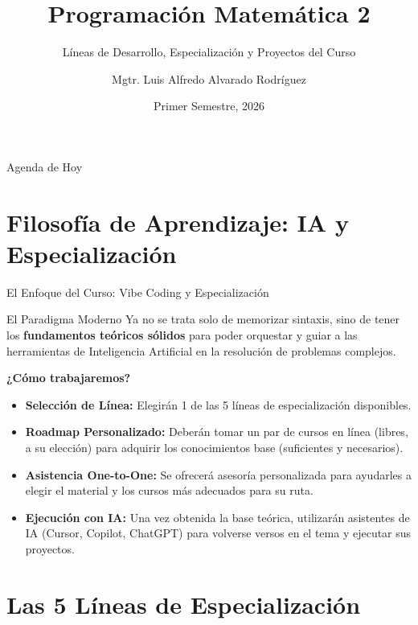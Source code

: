 \documentclass[aspectratio=169]{beamer}
\title[PM2 - Líneas y Proyectos]{Programación Matemática 2}
\subtitle{Líneas de Desarrollo, Especialización y Proyectos del Curso}
\author[Luis Alfredo Alvarado]{Mgtr. Luis Alfredo Alvarado Rodríguez}
\institute[ECFM - USAC]{
    Escuela de Ciencias Físicas y Matemáticas \\
    Universidad de San Carlos de Guatemala
}
\date{Primer Semestre, 2026}
\begin{document}
\begin{frame}
    \titlepage
\end{frame}

\begin{frame}{Agenda de Hoy}
    \tableofcontents
\end{frame}

\section{Filosofía de Aprendizaje: IA y Especialización}

\begin{frame}{El Enfoque del Curso: Vibe Coding y Especialización}
    \begin{block}{El Paradigma Moderno}
        Ya no se trata solo de memorizar sintaxis, sino de tener los \textbf{fundamentos teóricos sólidos} para poder orquestar y guiar a las herramientas de Inteligencia Artificial en la resolución de problemas complejos.
    \end{block}
    
    \vspace{0.3cm}
    \textbf{¿Cómo trabajaremos?}
    \begin{itemize}
        \item \textbf{Selección de Línea:} Elegirán 1 de las 5 líneas de especialización disponibles.
        \item \textbf{Roadmap Personalizado:} Deberán tomar un par de cursos en línea (libres, a su elección) para adquirir los conocimientos base (suficientes y necesarios).
        \item \textbf{Asistencia One-to-One:} Se ofrecerá asesoría personalizada para ayudarles a elegir el material y los cursos más adecuados para su ruta.
        \item \textbf{Ejecución con IA:} Una vez obtenida la base teórica, utilizarán asistentes de IA (Cursor, Copilot, ChatGPT) para volverse versos en el tema y ejecutar sus proyectos.
    \end{itemize}
\end{frame}

\section{Las 5 Líneas de Especialización}
\end{document}
